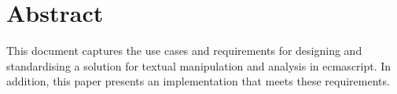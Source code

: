 
\begingroup
\let\clearpage\relax
\let\cleardoublepage\relax
\let\cleardoublepage\relax

\chapter*{Abstract}

This document captures the use cases and requirements for designing and
standardising a solution for textual manipulation and analysis in
\gls{ecmascript}. In addition, this paper presents an implementation that
meets these requirements.

\endgroup

